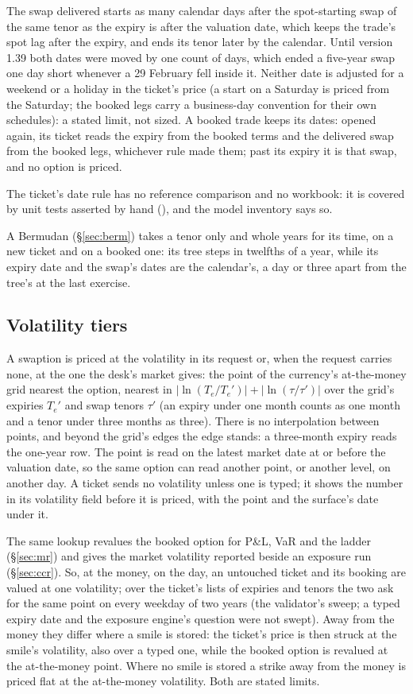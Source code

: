\documentclass[11pt,a4paper]{article}
\newcommand{\code}[1]{\ifmmode\text{\small\texttt{\detokenize{#1}}}\else{\small\path{#1}}\fi}
\let\plainsubsection\subsection
\renewcommand{\subsection}{\needspace{5\baselineskip}\plainsubsection}
\begin{document}
The swap delivered starts as many calendar days after the spot-starting swap of the same tenor as the expiry is after the valuation date, which keeps the trade's spot lag after the expiry, and ends its tenor later by the calendar. Until version 1.39 both dates were moved by one count of days, which ended a five-year swap one day short whenever a 29 February fell inside it. Neither date is adjusted for a weekend or a holiday in the ticket's price (a start on a Saturday is priced from the Saturday; the booked legs carry a business-day convention for their own schedules): a stated limit, not sized. A booked trade keeps its dates: opened again, its ticket reads the expiry from the booked terms and the delivered swap from the booked legs, whichever rule made them; past its expiry it is that swap, and no option is priced.

The ticket's date rule has no reference comparison and no workbook: it is covered by unit tests asserted by hand (\code{product-defaults.test.js}), and the model inventory says so.

A Bermudan (\S\ref{sec:berm}) takes a tenor only and whole years for its time, on a new ticket and on a booked one: its tree steps in twelfths of a year, while its expiry date and the swap's dates are the calendar's, a day or three apart from the tree's at the last exercise.

\subsection{Volatility tiers}\label{sec:swpn-vol}
A swaption is priced at the volatility in its request or, when the request carries none, at the one the desk's market gives: the point of the currency's at-the-money grid nearest the option, nearest in $|\ln(T_e/T_e')|+|\ln(\tau/\tau')|$ over the grid's expiries $T_e'$ and swap tenors $\tau'$ (an expiry under one month counts as one month and a tenor under three months as three). There is no interpolation between points, and beyond the grid's edges the edge stands: a three-month expiry reads the one-year row. The point is read on the latest market date at or before the valuation date, so the same option can read another point, or another level, on another day. A ticket sends no volatility unless one is typed; it shows the number in its volatility field before it is priced, with the point and the surface's date under it.

The same lookup revalues the booked option for P\&L, VaR and the ladder (\S\ref{sec:mr}) and gives the market volatility reported beside an exposure run (\S\ref{sec:ccr}). So, at the money, on the day, an untouched ticket and its booking are valued at one volatility; over the ticket's lists of expiries and tenors the two ask for the same point on every weekday of two years (the validator's sweep; a typed expiry date and the exposure engine's question were not swept). Away from the money they differ where a smile is stored: the ticket's price is then struck at the smile's volatility, also over a typed one, while the booked option is revalued at the at-the-money point. Where no smile is stored a strike away from the money is priced flat at the at-the-money volatility. Both are stated limits.
\end{document}
